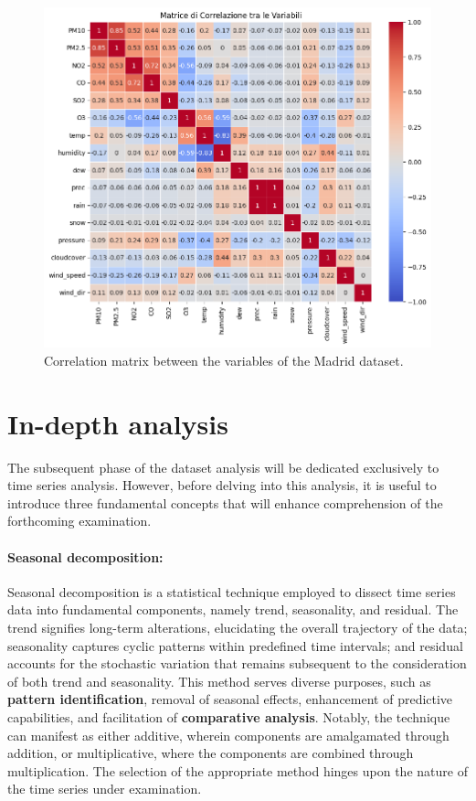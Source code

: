\begin{figure}[h]
    \centering
    \includegraphics[width=0.75\linewidth]{images/corr_matrix_madrid.png}
    \caption{Correlation matrix between the variables of the Madrid dataset.}
    \label{fig:corr_matrix_madrid}
\end{figure}

\newpage
\section{In-depth analysis}

The subsequent phase of the dataset analysis will be dedicated exclusively to time series analysis. However, before delving into this analysis, it is useful to introduce three fundamental concepts that will enhance comprehension of the forthcoming examination.

\paragraph{Seasonal decomposition:}Seasonal decomposition is a statistical technique employed to dissect time series data into fundamental components, namely trend, seasonality, and residual. The trend signifies long-term alterations, elucidating the overall trajectory of the data; seasonality captures cyclic patterns within predefined time intervals; and residual accounts for the stochastic variation that remains subsequent to the consideration of both trend and seasonality.
This method serves diverse purposes, such as \textbf{pattern identification}, removal of seasonal effects, enhancement of predictive capabilities, and facilitation of \textbf{comparative analysis}. Notably, the technique can manifest as either additive, wherein components are amalgamated through addition, or multiplicative, where the components are combined through multiplication. The selection of the appropriate method hinges upon the nature of the time series under examination.

